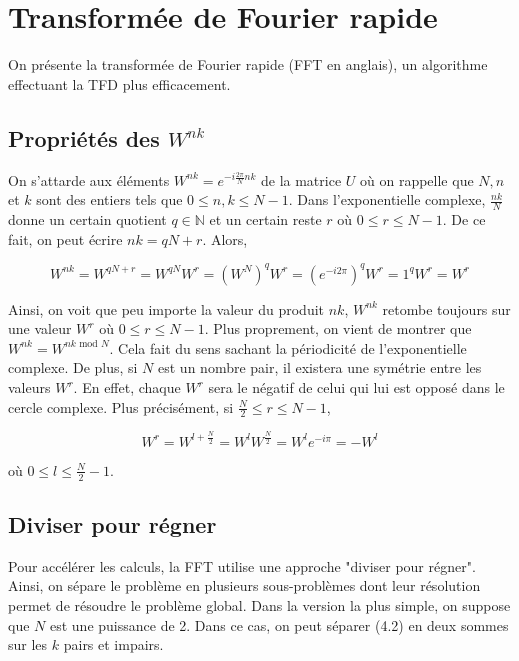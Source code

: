 \newpage
\section{Transformée de Fourier rapide}
On présente la transformée de Fourier rapide (FFT en anglais), un algorithme effectuant la TFD plus efficacement.

\subsection{Propriétés des $W^{nk}$}
On s'attarde aux éléments $W^{nk} = e^{-i\frac{2\pi}{N}nk}$ de la matrice $U$ où on rappelle que $N,n$ et $k$ sont des entiers tels que $0 \leq n,k \leq N-1$. Dans l'exponentielle complexe, $\frac{nk}{N}$ donne un certain quotient $q \in \mathbb{N}$ et un certain reste $r$ où $0 \leq r \leq N-1$. De ce fait, on peut écrire $nk = qN + r$. Alors,

\begin{equation*}
    W^{nk} = W^{qN + r} = W^{qN}W^r = \left(W^N\right)^q W^r = \left(e^{-i2\pi}\right)^q W^r = 1^q W^r = W^r
\end{equation*}

Ainsi, on voit que peu importe la valeur du produit $nk$, $W^{nk}$ retombe toujours sur une valeur $W^r$ où $0 \leq r \leq N-1$. Plus proprement, on vient de montrer que $W^{nk} = W^{nk \text{ mod } N}$. Cela fait du sens sachant la périodicité de l'exponentielle complexe. De plus, si $N$ est un nombre pair, il existera une symétrie entre les valeurs $W^{r}$. En effet, chaque $W^{r}$ sera le négatif de celui qui lui est opposé dans le cercle complexe. Plus précisément, si $\frac{N}{2} \leq r \leq N-1$, 

\begin{equation*}
    W^r = W^{l + \frac{N}{2}} = W^lW^{\frac{N}{2}} = W^l e^{-i\pi} = -W^l
\end{equation*}

où $0 \leq l \leq \frac{N}{2} - 1$.

\subsection{Diviser pour régner}
Pour accélérer les calculs, la FFT utilise une approche "diviser pour régner". Ainsi, on sépare le problème en plusieurs sous-problèmes dont leur résolution permet de résoudre le problème global. Dans la version la plus simple, on suppose que $N$ est une puissance de 2. Dans ce cas, on peut séparer (4.2) en deux sommes sur les $k$ pairs et impairs.

